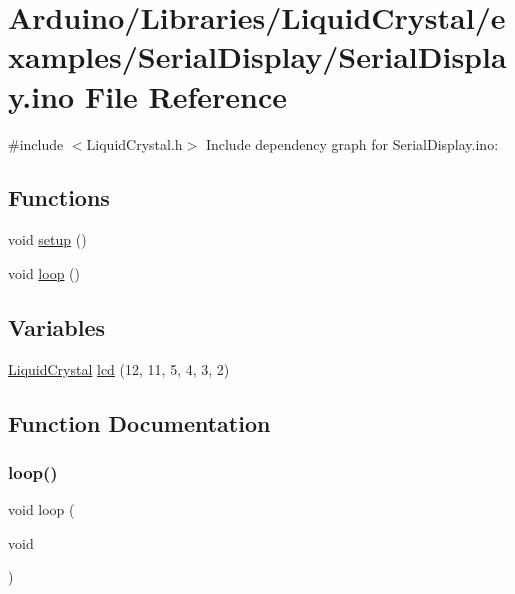 \hypertarget{_serial_display_8ino}{}\section{Arduino/\+Libraries/\+Liquid\+Crystal/examples/\+Serial\+Display/\+Serial\+Display.ino File Reference}
\label{_serial_display_8ino}
{\ttfamily \#include $<$Liquid\+Crystal.\+h$>$}\newline
Include dependency graph for Serial\+Display.\+ino\+:
\subsection*{Functions}
\begin{DoxyCompactItemize}
\item 
void \hyperlink{_serial_display_8ino_a4fc01d736fe50cf5b977f755b675f11d}{setup} ()
\item 
void \hyperlink{_serial_display_8ino_afe461d27b9c48d5921c00d521181f12f}{loop} ()
\end{DoxyCompactItemize}
\subsection*{Variables}
\begin{DoxyCompactItemize}
\item 
\hyperlink{class_liquid_crystal}{Liquid\+Crystal} \hyperlink{_serial_display_8ino_a7226623e632d4109904c86009c9f3b60}{lcd} (12, 11, 5, 4, 3, 2)
\end{DoxyCompactItemize}


\subsection{Function Documentation}
\mbox{\label{_serial_display_8ino_afe461d27b9c48d5921c00d521181f12f}} 
\subsubsection{\texorpdfstring{loop()}{loop()}}
{\footnotesize\ttfamily void loop (\begin{DoxyParamCaption}\item[{void}]{ }\end{DoxyParamCaption})}

